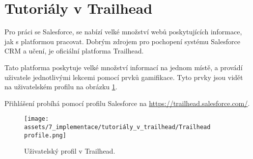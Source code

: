 \section{Tutoriály v Trailhead}
Pro práci se Salesforce, se nabízí velké množství webů poskytujících informace, jak s platformou pracovat. Dobrým zdrojem pro pochopení systému Salesforce CRM a učení, je oficiální platforma Trailhead. 

Tato platforma poskytuje velké množství informací na jednom místě, a provádí uživatele jednotlivými lekcemi pomocí prvků gamifikace. Tyto prvky jsou vidět na uživatelském profilu na obrázku \ref{fig:Trailhead_profile}. 

Přihlášení probíhá pomocí profilu Salesforce na \url{https://trailhead.salesforce.com/}.

\begin{figure}[h!]
    \centering
    \texttt{[image: assets/7\_implementace/tutoriály\_v\_trailhead/Trailhead profile.png]}
    \caption{Uživatelský profil v Trailhead.}
    \label{fig:Trailhead_profile}
\end{figure}
\FloatBarrier

